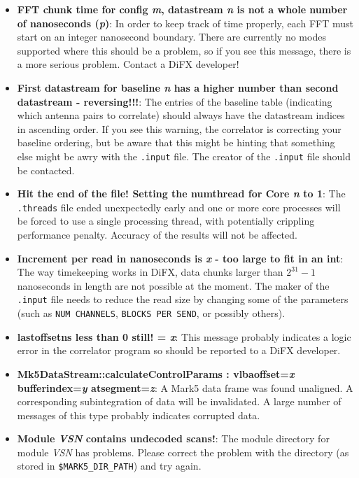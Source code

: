 \begin{itemize}
\item {\bf FFT chunk time for config {\it m}, datastream {\it n} is not a whole number of nanoseconds ({\it p})}:
In order to keep track of time properly, each FFT must start on an integer nanosecond boundary.
There are currently no modes supported where this should be a problem, so if you see this message, there is a more serious problem.
Contact a DiFX developer!

\item {\bf First datastream for baseline {\it n} has a higher number than second datastream - reversing!!!}:
The entries of the baseline table (indicating which antenna pairs to correlate) should always have the datastream indices in ascending order.
If you see this warning, the correlator is correcting your baseline ordering, but be aware that this might be hinting that something else might be awry with the {\tt .input} file.
The creator of the {\tt .input} file should be contacted.

\item {\bf Hit the end of the file! Setting the numthread for Core {\it n} to 1}:
The {\tt .threads} file ended unexpectedly early and one or more core processes will be forced to use a single processing thread, with potentially crippling performance penalty.
Accuracy of the results will not be affected.

\item {\bf Increment per read in nanoseconds is {\it x} - too large to fit in an int}:
The way timekeeping works in DiFX, data chunks larger than $2^{31}-1$ nanoseconds in length are not possible at the moment.
The maker of the {\tt .input} file needs to reduce the read size by
changing some of the parameters (such as {\tt NUM CHANNELS}, {\tt BLOCKS PER SEND}, or possibly others).

\item {\bf lastoffsetns less than 0 still! = {\it x}}:
This message probably indicates a logic error in the correlator program so should be reported to a DiFX developer.

\item {\bf Mk5DataStream::calculateControlParams : vlbaoffset={\it x} bufferindex={\it y} atsegment={\it z}}:
A Mark5 data frame was found unaligned.
A corresponding subintegration of data will be invalidated.
A large number of messages of this type probably indicates corrupted data.

\item {\bf Module {\it VSN} contains undecoded scans!}:
The module directory for module {\it VSN} has problems.
Please correct the problem with the directory (as stored in {\tt \$MARK5\_DIR\_PATH}) and try again.


\end{itemize}
